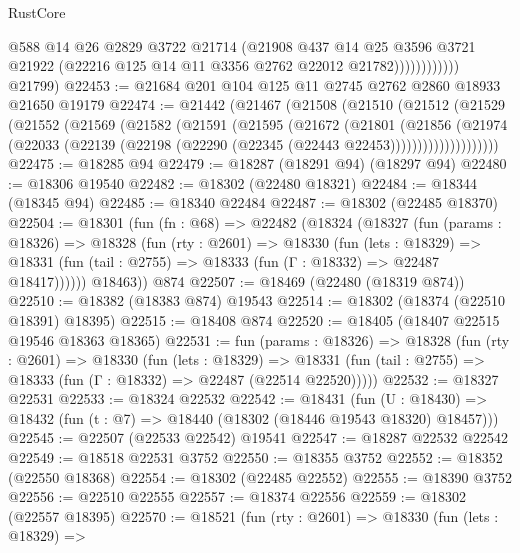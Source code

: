 \begin{lexlean}{RustCore}
\begin{coremodule}
                          @588
                          @14
                          @26
                          @2829
                          @3722
                          @21714
                          (@21908
                            @437
                            @14
                            @25
                            @3596
                            @3721
                            @21922
                            (@22216 @125 @14 @11 @3356 @2762 @22012 @21782))))))))))))
      @21799)
@22453 := @21684 @201 @104 @125 @11 @2745 @2762 @2860 @18933 @21650 @19179
@22474 := @21442
    (@21467
      (@21508
        (@21510
          (@21512
            (@21529
              (@21552
                (@21569
                  (@21582
                    (@21591
                      (@21595
                        (@21672
                          (@21801
                            (@21856
                              (@21974
                                (@22033
                                  (@22139 (@22198 (@22290 (@22345 (@22443 @22453))))))))))))))))))))
@22475 := @18285 @94
@22479 := @18287 (@18291 @94) (@18297 @94)
@22480 := @18306 @19540
@22482 := @18302 (@22480 @18321)
@22484 := @18344 (@18345 @94)
@22485 := @18340 @22484
@22487 := @18302 (@22485 @18370)
@22504 := @18301
    (fun (fn : @68) =>
    @22482
      (@18324
        (@18327
          (fun (params : @18326) =>
          @18328
            (fun (rty : @2601) =>
            @18330
              (fun (lets : @18329) =>
              @18331 (fun (tail : @2755) => @18333 (fun (Γ : @18332) => @22487 @18417))))))
        @18463))
    @874
@22507 := @18469 (@22480 (@18319 @874))
@22510 := @18382 (@18383 @874) @19543
@22514 := @18302 (@18374 (@22510 @18391) @18395)
@22515 := @18408 @874
@22520 := @18405 (@18407 @22515 @19546 @18363 @18365)
@22531 := fun (params : @18326) =>
  @18328
    (fun (rty : @2601) =>
    @18330
      (fun (lets : @18329) =>
      @18331 (fun (tail : @2755) => @18333 (fun (Γ : @18332) => @22487 (@22514 @22520)))))
@22532 := @18327 @22531
@22533 := @18324 @22532
@22542 := @18431
    (fun (U : @18430) => @18432 (fun (t : @7) => @18440 (@18302 (@18446 @19543 @18320) @18457)))
@22545 := @22507 (@22533 @22542) @19541
@22547 := @18287 @22532 @22542
@22549 := @18518 @22531 @3752
@22550 := @18355 @3752
@22552 := @18352 (@22550 @18368)
@22554 := @18302 (@22485 @22552)
@22555 := @18390 @3752
@22556 := @22510 @22555
@22557 := @18374 @22556
@22559 := @18302 (@22557 @18395)
@22570 := @18521
    (fun (rty : @2601) =>
    @18330
      (fun (lets : @18329) =>

\end{coremodule}
\end{lexlean}
